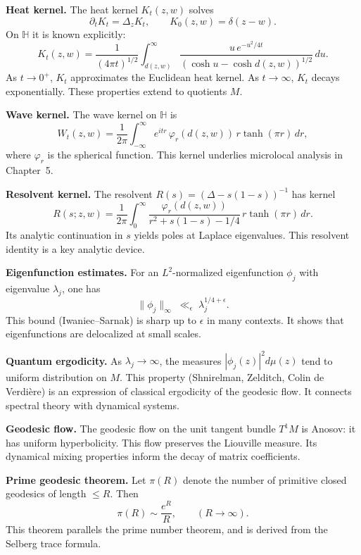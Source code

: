 \medskip

\noindent\textbf{Heat kernel.}
The heat kernel $K_{t}(z,w)$ solves
\[
  \partial_{t} K_{t} = \Delta_{z} K_{t}, \qquad K_{0}(z,w)=\delta(z-w).
\]
On $\mathbb{H}$ it is known explicitly:
\[
  K_{t}(z,w) = \frac{1}{(4\pi t)^{1/2}} \int_{d(z,w)}^{\infty} \frac{u\,e^{-u^{2}/4t}}{(\cosh u - \cosh d(z,w))^{1/2}}\,du.
\]
As $t\to 0^{+}$, $K_{t}$ approximates the Euclidean heat kernel.
As $t\to\infty$, $K_{t}$ decays exponentially.
These properties extend to quotients $M$.

\medskip

\noindent\textbf{Wave kernel.}
The wave kernel on $\mathbb{H}$ is
\[
  W_{t}(z,w) = \frac{1}{2\pi} \int_{-\infty}^{\infty} e^{it r}\,\varphi_{r}(d(z,w))\,r\tanh(\pi r)\,dr,
\]
where $\varphi_{r}$ is the spherical function.
This kernel underlies microlocal analysis in Chapter~5.

\medskip

\noindent\textbf{Resolvent kernel.}
The resolvent $R(s) = (\Delta - s(1-s))^{-1}$ has kernel
\[
  R(s;z,w) = \frac{1}{2\pi}\int_{0}^{\infty} \frac{\varphi_{r}(d(z,w))}{r^{2}+s(1-s)-1/4}\,r\tanh(\pi r)\,dr.
\]
Its analytic continuation in $s$ yields poles at Laplace eigenvalues.
This resolvent identity is a key analytic device.

\medskip

\noindent\textbf{Eigenfunction estimates.}
For an $L^{2}$-normalized eigenfunction $\phi_{j}$ with eigenvalue $\lambda_{j}$,
one has
\[
  \|\phi_{j}\|_{\infty} \;\ll_{\epsilon}\; \lambda_{j}^{1/4+\epsilon}.
\]
This bound (Iwaniec–Sarnak) is sharp up to $\epsilon$ in many contexts.
It shows that eigenfunctions are delocalized at small scales.

\medskip

\noindent\textbf{Quantum ergodicity.}
As $\lambda_{j}\to\infty$, the measures $|\phi_{j}(z)|^{2}d\mu(z)$
tend to uniform distribution on $M$.
This property (Shnirelman, Zelditch, Colin de Verdière)
is an expression of classical ergodicity of the geodesic flow.
It connects spectral theory with dynamical systems.

\medskip

\noindent\textbf{Geodesic flow.}
The geodesic flow on the unit tangent bundle $T^{1}M$
is Anosov: it has uniform hyperbolicity.
This flow preserves the Liouville measure.
Its dynamical mixing properties inform the decay of matrix coefficients.

\medskip

\noindent\textbf{Prime geodesic theorem.}
Let $\pi(R)$ denote the number of primitive closed geodesics of length $\le R$.
Then
\[
  \pi(R) \sim \frac{e^{R}}{R}, \qquad (R\to\infty).
\]
This theorem parallels the prime number theorem,
and is derived from the Selberg trace formula.

